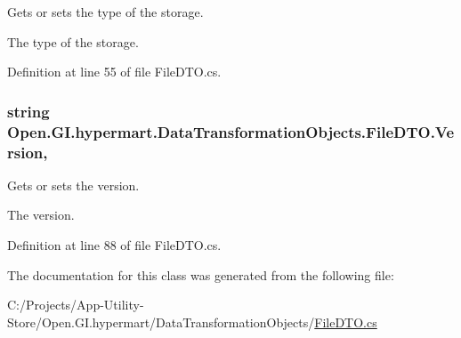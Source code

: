 Gets or sets the type of the storage. 

The type of the storage. 

Definition at line 55 of file File\+D\+T\+O.\+cs.

\hypertarget{class_open_1_1_g_i_1_1hypermart_1_1_data_transformation_objects_1_1_file_d_t_o_ac55a6e7062078277eed54e42b7c29d73}{}
\subsubsection[{Version}]{\setlength{\rightskip}{0pt plus 5cm}string Open.\+G\+I.\+hypermart.\+Data\+Transformation\+Objects.\+File\+D\+T\+O.\+Version\hspace{0.3cm}{\ttfamily [get]}, {\ttfamily [set]}}\label{class_open_1_1_g_i_1_1hypermart_1_1_data_transformation_objects_1_1_file_d_t_o_ac55a6e7062078277eed54e42b7c29d73}


Gets or sets the version. 

The version. 

Definition at line 88 of file File\+D\+T\+O.\+cs.



The documentation for this class was generated from the following file\+:\begin{DoxyCompactItemize}
\item 
C\+:/\+Projects/\+App-\/\+Utility-\/\+Store/\+Open.\+G\+I.\+hypermart/\+Data\+Transformation\+Objects/\hyperlink{_file_d_t_o_8cs}{File\+D\+T\+O.\+cs}\end{DoxyCompactItemize}

